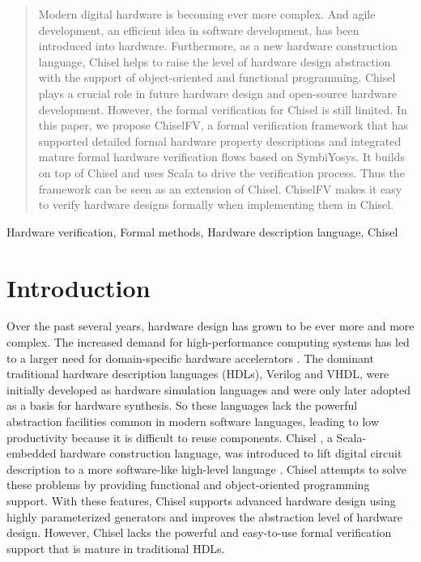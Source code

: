 \documentclass[conference]{IEEEtran}
\theoremstyle{definition}
\begin{document}
\begin{abstract}
    Modern digital hardware is becoming ever more complex. And agile development, an efficient idea in software development, has been introduced into hardware. Furthermore, as a new hardware construction language, Chisel helps to raise the level of hardware design abstraction with the support of object-oriented and functional programming. Chisel plays a crucial role in future hardware design and open-source hardware development. However, the formal verification for Chisel is still limited. In this paper, we propose ChiselFV, a formal verification framework that has supported detailed formal hardware property descriptions and integrated mature formal hardware verification flows based on SymbiYosys. It builds on top of Chisel and uses Scala to drive the verification process. Thus the framework can be seen as an extension of Chisel. ChiselFV makes it easy to verify hardware designs formally when implementing them in Chisel.
\end{abstract}

\begin{IEEEkeywords}
    Hardware verification, Formal methods, Hardware description language, Chisel
\end{IEEEkeywords}

\section{Introduction}
Over the past several years, hardware design has grown to be ever more and more complex. The increased demand for high-performance computing systems has led to a larger need for domain-specific hardware accelerators \cite{dally2020domain}.
The dominant traditional hardware description languages (HDLs), Verilog and VHDL, were initially developed as hardware simulation languages and were only later adopted as a basis for hardware synthesis. So these languages lack the powerful abstraction facilities common in modern software languages, leading to low productivity because it is difficult to reuse components.
Chisel \cite{bachrach2012chisel}, a Scala-embedded hardware construction language, was introduced to lift digital circuit description to a more software-like high-level language \cite{dobis2021chiselverify}.
Chisel attempts to solve these problems by providing functional and object-oriented programming support. With these features, Chisel supports advanced hardware design using highly parameterized generators and improves the abstraction level of hardware design. However, Chisel lacks the powerful and easy-to-use formal verification support that is mature in traditional HDLs.
\end{document}

